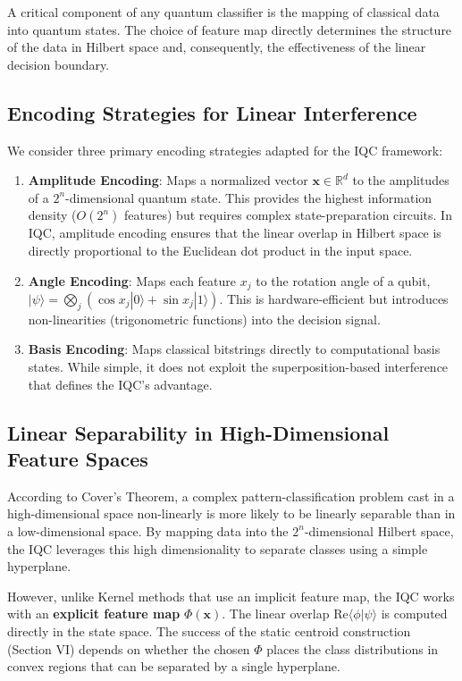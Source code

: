 \documentclass[conference]{IEEEtran}
\begin{document}
A critical component of any quantum classifier is the mapping of classical data into quantum states. The choice of feature map directly determines the structure of the data in Hilbert space and, consequently, the effectiveness of the linear decision boundary.

\subsection{Encoding Strategies for Linear Interference}

We consider three primary encoding strategies adapted for the IQC framework:
\begin{enumerate}
    \item \textbf{Amplitude Encoding}: Maps a normalized vector $\mathbf{x} \in \mathbb{R}^d$ to the amplitudes of a $2^n$-dimensional quantum state. This provides the highest information density ($O(2^n)$ features) but requires complex state-preparation circuits. In IQC, amplitude encoding ensures that the linear overlap in Hilbert space is directly proportional to the Euclidean dot product in the input space.
    \item \textbf{Angle Encoding}: Maps each feature $x_j$ to the rotation angle of a qubit, $|\psi\rangle = \bigotimes_j ( \cos x_j |0\rangle + \sin x_j |1\rangle)$. This is hardware-efficient but introduces non-linearities (trigonometric functions) into the decision signal.
    \item \textbf{Basis Encoding}: Maps classical bitstrings directly to computational basis states. While simple, it does not exploit the superposition-based interference that defines the IQC's advantage.
\end{enumerate}

\subsection{Linear Separability in High-Dimensional Feature Spaces}

According to Cover's Theorem, a complex pattern-class\-i\-fi\-ca\-tion problem cast in a high-dimensional space non-linearly is more likely to be linearly separable than in a low-dimensional space. By mapping data into the $2^n$-dimensional Hilbert space, the IQC leverages this high dimensionality to separate classes using a simple hyperplane. 

However, unlike Kernel methods that use an implicit feature map, the IQC works with an \textbf{explicit feature map} $\Phi(\mathbf{x})$. The linear overlap $\mathrm{Re}\langle \phi | \psi \rangle$ is computed directly in the state space. The success of the static centroid construction (Section VI) depends on whether the chosen $\Phi$ places the class distributions in convex regions that can be separated by a single hyperplane.
\end{document}

